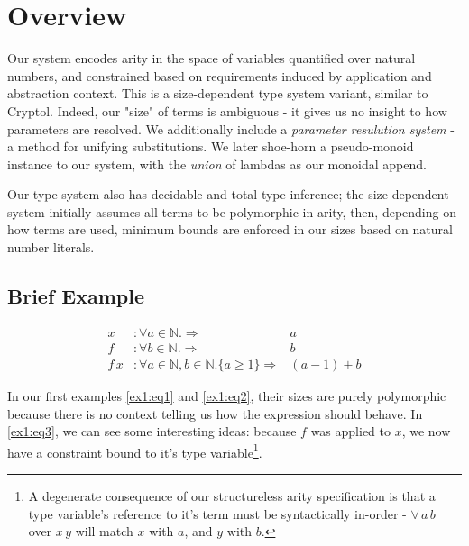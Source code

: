 \documentclass{article}
\begin{document}
\section{Overview}

\begin{flushleft}
Our system encodes arity in the space of variables quantified over natural
numbers, and constrained based on requirements induced by application and
abstraction context. This is a size-dependent type system variant, similar to
Cryptol. Indeed, our "size" of terms is ambiguous - it gives us no insight
to how parameters are resolved. We additionally include a \textit{parameter
resulution system} - a method for unifying substitutions. We later shoe-horn
a pseudo-monoid instance to our system, with the \textit{union} of lambdas as our
monoidal append.

Our type system also has decidable and total type inference; the size-dependent
system initially assumes all terms to be polymorphic in arity, then, depending
on how terms are used, minimum bounds are enforced in our sizes based on natural
number literals.
\end{flushleft}

\subsection{Brief Example}

\begin{align}
x &: \forall a \in \mathbb{N}. \Rightarrow &a\label{ex1:eq1}\\
f &: \forall b \in \mathbb{N}. \Rightarrow &b\label{ex1:eq2}\\
f \, x &: \forall a \in \mathbb{N}, b \in \mathbb{N}.
\{a \geq 1\} \Rightarrow &(a - 1) + b\label{ex1:eq3}
\end{align}

\begin{flushleft}
In our first examples \ref{ex1:eq1} and \ref{ex1:eq2}, their sizes are purely
polymorphic because there is no context telling us how the expression should
behave. In \ref{ex1:eq3}, we can see some interesting ideas: because $f$ was
applied to $x$, we now have a constraint bound to it's
type variable\footnote{A degenerate consequence of our structureless arity specification
is that a type variable's reference to it's term must be syntactically in-order -
$\forall \, a \, b$ over $x \, y$ will match $x$ with $a$, and $y$ with $b$.}.
\end{flushleft}
\end{document}
